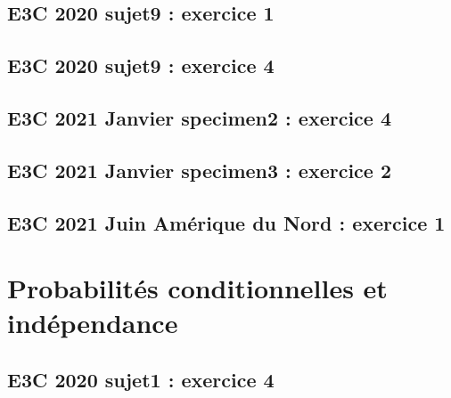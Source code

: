 \documentclass[lang=fr,edition=teacher,layout=sheet]{mxbook}
\begin{document}
\begingroup\endgroup
\par\bigskip
{}\subsection*{E3C 2020 sujet9 : exercice 1}
\begingroup\endgroup
\par\bigskip
{}\subsection*{E3C 2020 sujet9 : exercice 4}
\begingroup\endgroup
\par\bigskip
{}\subsection*{E3C 2021 Janvier specimen2 : exercice 4}
\begingroup\endgroup
\par\bigskip
{}\subsection*{E3C 2021 Janvier specimen3 : exercice 2}
\begingroup\endgroup
\par\bigskip
{}\subsection*{E3C 2021 Juin Amérique du Nord : exercice 1}
\begingroup\endgroup
\par\bigskip
\clearpage\section*{Probabilités conditionnelles et indépendance}
\subsection*{E3C 2020 sujet1 : exercice 4}
\begingroup\endgroup
\par\bigskip
\end{document}
